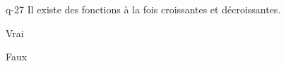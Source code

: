 \begin{truefalse}{q-27}
Il existe des fonctions à la fois croissantes et décroissantes.
\item* Vrai
\item Faux
\end{truefalse}

